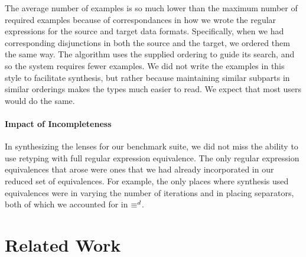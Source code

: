 \documentclass[numbers,10pt,preprint\ifanon ,nocopyrightspace\fi]{sigplanconf}
\begin{document}
The average number of examples is so much lower than the maximum
number of required examples because of correspondances in how we wrote
the regular expressions for the source and target data formats. 
Specifically, when we had corresponding disjunctions in both the
source and the target, we ordered them the same way.  The algorithm
uses the supplied ordering to guide its search, and so the system
requires fewer examples.   We did not write the examples in this style
to facilitate synthesis, but rather because maintaining similar
subparts in similar orderings makes the types much easier to 
read. We expect that most users would do the same.


\paragraph*{Impact of Incompleteness}

In synthesizing the lenses for our benchmark suite, we did not miss
the ability to use retyping with full regular expression equivalence.
The only regular expression equivalences that arose were ones that we
had already incorporated in our reduced set of equivalences.
For example, the only places where synthesis
used \StarRegexType{} equivalences were in varying the number
of iterations and in placing separators, both of 
which we accounted for in $\equiv^d$.





\section{Related Work}
\label{sec:related}

\ifanon\else {}
\fi
\end{document}
